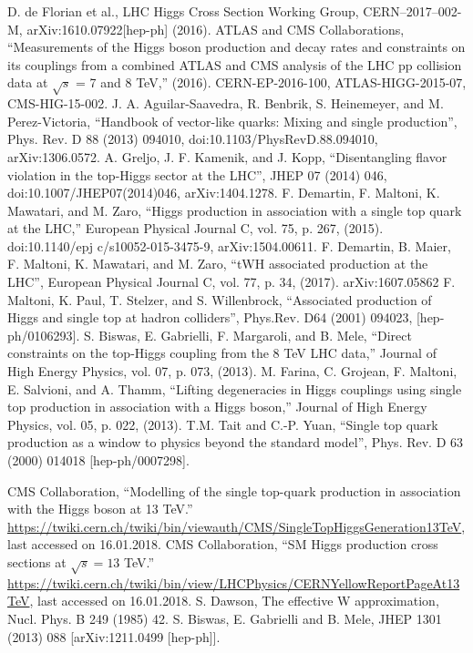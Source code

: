 \documentclass[print]{nuthesis}
\begin{document}
\begin{thebibliography}{300}
 D. de Florian et al., LHC Higgs Cross Section Working Group, CERN–2017–002-M, arXiv:1610.07922[hep-ph] (2016).
 ATLAS and CMS Collaborations, ``Measurements of the Higgs boson production and decay rates and constraints on its couplings from a combined ATLAS and CMS analysis of the LHC pp collision data at $\sqrt{s}$ = 7 and 8 TeV,'' (2016). CERN-EP-2016-100, ATLAS-HIGG-2015-07, CMS-HIG-15-002.  
 J. A. Aguilar-Saavedra, R. Benbrik, S. Heinemeyer, and M. Perez-Victoria, ``Handbook of vector-like quarks: Mixing and single production'', Phys. Rev. D 88 (2013) 094010, doi:10.1103/PhysRevD.88.094010, arXiv:1306.0572.
A. Greljo, J. F. Kamenik, and J. Kopp, ``Disentangling flavor violation in the top-Higgs sector at the LHC'', JHEP 07 (2014) 046, doi:10.1007/JHEP07(2014)046, arXiv:1404.1278.
 F. Demartin, F. Maltoni, K. Mawatari, and M. Zaro, ``Higgs production in association with a single top quark at the LHC,'' European Physical Journal C, vol. 75, p. 267, (2015). doi:10.1140/epj
c/s10052-015-3475-9, arXiv:1504.00611.
 F. Demartin, B. Maier, F. Maltoni, K. Mawatari, and M. Zaro, ``tWH associated production at the LHC'', European Physical Journal C, vol. 77, p. 34, (2017). arXiv:1607.05862
 F. Maltoni, K. Paul, T. Stelzer, and S. Willenbrock, ``Associated production of Higgs and single top at hadron colliders'', Phys.Rev. D64 (2001) 094023, [hep-ph/0106293].
 S. Biswas, E. Gabrielli, F. Margaroli, and B. Mele, ``Direct constraints on the top-Higgs coupling from the 8 TeV LHC data,'' Journal of High Energy Physics, vol. 07, p. 073, (2013).
 M. Farina, C. Grojean, F. Maltoni, E. Salvioni, and A. Thamm, ``Lifting degeneracies in Higgs couplings using single top production in association with a Higgs boson,'' Journal of High Energy Physics, vol. 05, p. 022, (2013).
 T.M. Tait and C.-P. Yuan, ``Single top quark production as a window to physics beyond the standard model'', Phys. Rev. D 63 (2000) 014018 [hep-ph/0007298].

 CMS Collaboration, ``Modelling of the single top-quark production in association with the Higgs boson at 13 TeV.'' \url{https://twiki.cern.ch/twiki/bin/viewauth/CMS/SingleTopHiggsGeneration13TeV}, last accessed on 16.01.2018.
 CMS Collaboration, ``SM Higgs production cross sections at $\sqrt{s} = 13$ TeV.'' \url{https://twiki.cern.ch/twiki/bin/view/LHCPhysics/CERNYellowReportPageAt13TeV}, last accessed on 16.01.2018.
 S. Dawson, The effective W approximation, Nucl. Phys. B 249 (1985) 42.
 S. Biswas, E. Gabrielli and B. Mele, JHEP 1301 (2013) 088 [arXiv:1211.0499 [hep-ph]].


\end{thebibliography}
\end{document}
